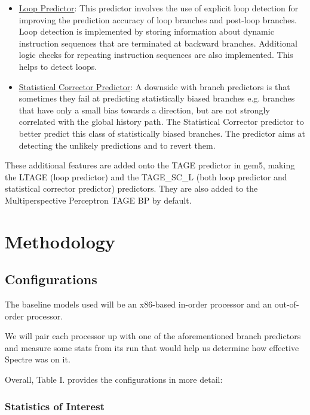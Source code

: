 \documentclass[twocolumn,showpacs,%
  nofootinbib,aps,superscriptaddress,%
  eqsecnum,prd,notitlepage,showkeys,10pt]{revtex4-1}
\begin{document}
\begin{itemize}
    \item \underline{Loop Predictor}: This predictor involves the use of explicit loop detection for improving the prediction accuracy of loop branches and post-loop branches. Loop detection is implemented by storing information about dynamic instruction sequences that are terminated at backward branches. Additional logic checks for repeating instruction sequences are also implemented. This helps to detect loops.\cite{joseph2000improving}
    \item \underline{Statistical Corrector Predictor}: A downside with branch predictors is that sometimes they fail at predicting statistically biased branches e.g. branches that have only a small bias towards a direction, but are not strongly correlated with the global history path. The Statistical Corrector predictor to better predict this class of statistically biased branches. The predictor aims at detecting the unlikely predictions and to revert them.\cite{seznec2016tage}
\end{itemize}

These additional features are added onto the TAGE predictor in gem5, making the LTAGE (loop predictor) and the TAGE\_SC\_L (both loop predictor and statistical corrector predictor) predictors. They are also added to the Multiperspective Perceptron TAGE BP by default. 

\section{Methodology}

\subsection{Configurations}

The baseline models used will be an x86-based in-order processor and an out-of-order processor.

We will pair each processor up with one of the aforementioned branch predictors and measure some stats from its run that would help us determine how effective Spectre was on it.

Overall, Table I. provides the configurations in more detail:

\subsubsection{Statistics of Interest}
\end{document}
